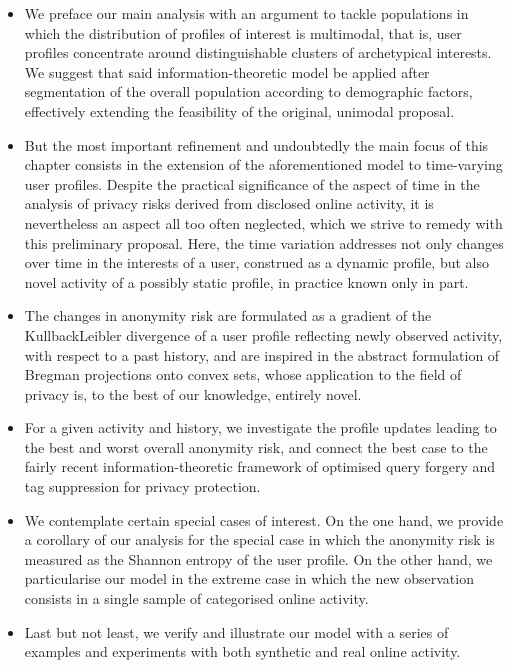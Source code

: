 \begin{itemize}
\item We preface our main analysis with an argument to tackle populations in which the distribution of profiles of interest is multimodal, that is, user profiles concentrate around distinguishable clusters of archetypical interests. We suggest that said information-theoretic model be applied after segmentation of the overall population according to demographic factors, effectively extending the feasibility of the original, unimodal proposal.

\item But the most important refinement and undoubtedly the main focus of this chapter consists in the extension of the aforementioned model to time-varying user profiles. Despite the practical significance of the aspect of time in the analysis of privacy risks derived from disclosed online activity, it is nevertheless an aspect all too often neglected, which we strive to remedy with this preliminary proposal. Here, the time variation addresses not only changes over time in the interests of a user, construed as a dynamic profile, but also novel activity of a possibly static profile, in practice known only in part.

\item The changes in anonymity risk are formulated as a gradient of the Kullback\hyph Leibler divergence of a user profile reflecting newly observed activity, with respect to a past history, and are inspired in the abstract formulation of Bregman projections onto convex sets, whose application to the field of privacy is, to the best of our knowledge, entirely novel.

\item For a given activity and history, we investigate the profile updates leading to the best and worst overall anonymity risk, and connect the best case to the fairly recent information-theoretic framework of optimised query forgery and tag suppression for privacy protection.

\item We contemplate certain special cases of interest. On the one hand, we provide a corollary of our analysis for the special case in which the anonymity risk is measured as the Shannon entropy of the user profile. On the other hand, we particularise our model in the extreme case in which the new observation consists in a single sample of categorised online activity.

\item Last but not least, we verify and illustrate our model with a series of examples and experiments with both synthetic and real online activity.

\end{itemize}

